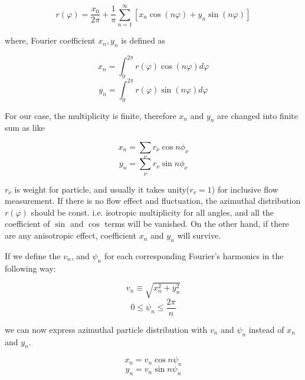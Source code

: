 \begin{equation}
	r(\varphi)=\frac{x_0}{2\pi} + \frac{1}{\pi}\sum_{n=1}^{\infty}[x_n \cos(n\varphi) + y_n \sin(n\varphi)]
	\label{eq:flow}
\end{equation}
\smallskip
	
	
	where, Fourier coefficient $x_n, y_n$ is defined as
	
\begin{equation}
	x_n = \int_{0}^{2\pi} r(\varphi)\cos(n\varphi)d\varphi	
\end{equation}
\begin{equation}
	y_n = \int_{0}^{2\pi} r(\varphi)\sin(n\varphi)d\varphi	
\end{equation}
\smallskip

For our case, the multiplicity is finite, therefore $x_n$ and $y_n$ are changed into finite sum as like

\begin{equation}
x_n=\sum_{\nu}r_{\nu}\cos{n\phi_{\nu}}
\end{equation}
\begin{equation}
y_n=\sum_{\nu}r_{\nu}\sin{n\phi_{\nu}}
\label{eq:yndef}
\end{equation}
\smallskip

 $r_\nu$ is weight for particle, and usually it takes unity($r_v = 1$) for inclusive flow measurement. If there is no flow effect and fluctuation, the azimuthal distribution $r(\varphi)$ should be const. i.e. isotropic multiplicity for all angles, and all the coefficient of $\sin$ and $\cos$ terms will be vanished. On the other hand, if there are any anisotropic effect, coefficient $x_n$ and $y_n$ will survive. 
 
 If we define the $v_n$, and $\psi_n$ for each corresponding Fourier's harmonics in the following way:

\begin{equation}
	v_n \equiv \sqrt{x_n^2 + y_n^2}
\end{equation}
\begin{equation}
	0 \le \psi_n \le \frac{2\pi}{n} 
\end{equation}
\smallskip

we can now express azimuthal particle distribution with $v_n$ and $\psi_n$ instead of $x_n$ and $y_n$.

\begin{equation}
x_n=v_n \cos{n\psi_n}
\end{equation}
\begin{equation}
y_n=v_n \sin{n\psi_n}
\label{eq:xnyndef}
\end{equation}
\smallskip

